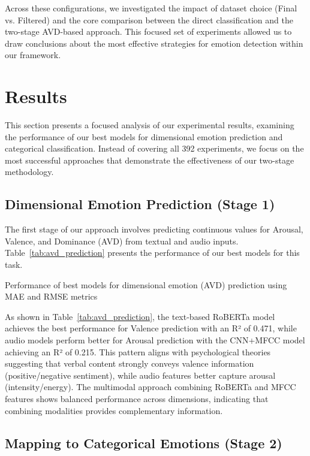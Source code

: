 \documentclass[12pt]{article}
\begin{document}
Across these configurations, we investigated the impact of dataset choice (Final vs. Filtered) and the core comparison between the direct classification and the two-stage AVD-based approach. This focused set of experiments allowed us to draw conclusions about the most effective strategies for emotion detection within our framework.

\section{Results}
\label{sec:results}

This section presents a focused analysis of our experimental results, examining the performance of our best models for dimensional emotion prediction and categorical classification. Instead of covering all 392 experiments, we focus on the most successful approaches that demonstrate the effectiveness of our two-stage methodology.

\subsection{Dimensional Emotion Prediction (Stage 1)}

The first stage of our approach involves predicting continuous values for Arousal, Valence, and Dominance (AVD) from textual and audio inputs. Table~\ref{tab:avd_prediction} presents the performance of our best models for this task.

\begin{table}[h]
\centering
\caption{Performance of best models for dimensional emotion (AVD) prediction using MAE and RMSE metrics}

\end{table}

As shown in Table~\ref{tab:avd_prediction}, the text-based RoBERTa model achieves the best performance for Valence prediction with an R² of 0.471, while audio models perform better for Arousal prediction with the CNN+MFCC model achieving an R² of 0.215. This pattern aligns with psychological theories suggesting that verbal content strongly conveys valence information (positive/negative sentiment), while audio features better capture arousal (intensity/energy). The multimodal approach combining RoBERTa and MFCC features shows balanced performance across dimensions, indicating that combining modalities provides complementary information.

\subsection{Mapping to Categorical Emotions (Stage 2)}
\end{document}
